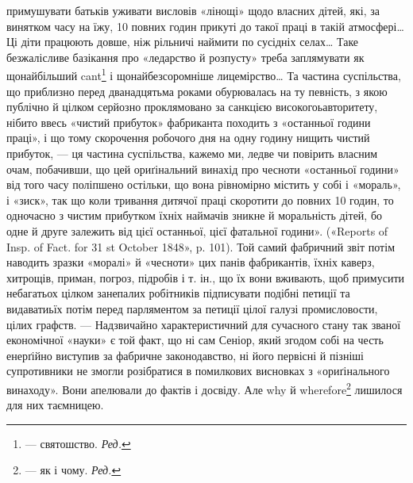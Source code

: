 примушувати батьків уживати висловів «лінощі» щодо власних дітей, які, за винятком часу на їжу, 10
повних годин прикуті до такої праці в такій атмосфері\dots{} Ці діти працюють
довше, ніж рільничі наймити по сусідніх селах\dots{} Таке безжалісливе базікання
про «ледарство й розпусту» треба заплямувати як щонайбільший cant\footnote*{
— святошство. \emph{Ред.}
} і щонайбезсоромніше
лицемірство\dots{} Та частина суспільства, що приблизно перед дванадцятьма роками обурювалась на ту
певність, з якою публічно й цілком серйозно проклямовано за санкцією високогоьавторитету, нібито
ввесь «чистий прибуток» фабриканта походить з «останньої години праці», і що тому скорочення
робочого дня на одну
годину нищить чистий прибуток, — ця частина суспільства, кажемо ми,
ледве чи повірить власним очам, побачивши, що цей ориґінальний винахід
про чесноти «останньої години» від того часу поліпшено остільки, що вона
рівномірно містить у собі і «мораль», і «зиск», так що коли тривання дитячої праці скоротити до
повних 10 годин, то одночасно з чистим прибутком їхніх наймачів зникне й моральність дітей, бо одне
й друге залежить від цієї останньої, цієї фатальної години». («Reports of Insp. of Fact. for 31 st
October 1848», p. 101). Той самий фабричний звіт потім наводить
зразки «моралі» й «чесноти» цих панів фабрикантів, їхніх каверз, хитрощів,
приман, погроз, підробів і т. ін., що їх вони вживають, щоб примусити небагатьох цілком занепалих
робітників підписувати подібні петиції та видаватиьїх потім перед парляментом за петиції цілої
галузі промисловости, цілих графств. — Надзвичайно характеристичний для сучасного стану так званої
економічної «науки» є той факт, що ні сам Сеніор, який згодом собі на честь енерґійно виступив за
фабричне законодавство, ні його первісні
й пізніші супротивники не змогли розібратися в помилкових висновках з «ориґінального винаходу». Вони
апелювали до фактів і досвіду. Але why й wherefore\footnote*{
— як і чому. \emph{Ред.}
} лишилося для них таємницею.
\parbreak{}  %
